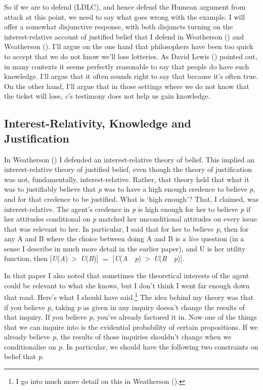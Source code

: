 \documentclass[
  10pt,
  letterpaper,
  DIV=11,
  numbers=noendperiod,
  twoside]{scrartcl}
\begin{document}
So if we are to defend (LDLC), and hence defend the Humean argument from
attack at this point, we need to say what goes wrong with the example. I
will offer a somewhat disjunctive response, with both disjuncts turning
on the interest-relative account of justified belief that I defend in
Weatherson () and Weatherson
(). I'll argue on the one hand that
philosophers have been too quick to accept that we do not know we'll
lose lotteries. As David Lewis () pointed
out, in many contexts it seems perfectly reasonable to say that people
do have such knowledge. I'll argue that it often sounds right to say
that because it's often true. On the other hand, I'll argue that in
those settings where we do not know that the ticket will lose,
\emph{c}'s testimony does not help us gain knowledge.

\subsection{Interest-Relativity, Knowledge and
Justification}\label{interest-relativity-knowledge-and-justification}

In Weatherson () I defended
an interest-relative theory of belief. This implied an interest-relative
theory of justified belief, even though the theory of justification was
not, fundamentally, interest-relative. Rather, that theory held that
what it was to justifiably believe that \emph{p} was to have a high
enough credence to believe \emph{p}, and for that credence to be
justified. What is `high enough'? That, I claimed, was
interest-relative. The agent's credence in \emph{p} is high enough for
her to believe \emph{p} if her attitudes conditional on \emph{p} matched
her unconditional attitudes on every issue that was relevant to her. In
particular, I said that for her to believe \emph{p}, then for any A and
B where the choice between doing A and B is a \emph{live} question (in a
sense I describe in much more detail in the earlier paper), and U is her
utility function, then
{[}\emph{U}(\emph{A})~\textgreater~\emph{U}(\emph{B}){]}~↔~{[}\emph{U}(\emph{A}~\textbar~\emph{p})~\textgreater~\emph{U}(\emph{B}~\textbar~\emph{p}){]}.

In that paper I also noted that sometimes the theoretical interests of
the agent could be relevant to what she knows, but I don't think I went
far enough down that road. Here's what I should have said.\footnote{I go
  into much more detail on this in Weatherson
  ().} The idea behind my theory was
that if you believe \emph{p}, taking \emph{p} as given in any inquiry
doesn't change the results of that inquiry. If you believe \emph{p},
you've already factored it in. Now one of the things that we can inquire
into is the evidential probability of certain propositions. If we
already believe \emph{p}, the results of those inquiries shouldn't
change when we conditionalise on \emph{p}. In particular, we should have
the following two constraints on belief that \emph{p}.
\end{document}
